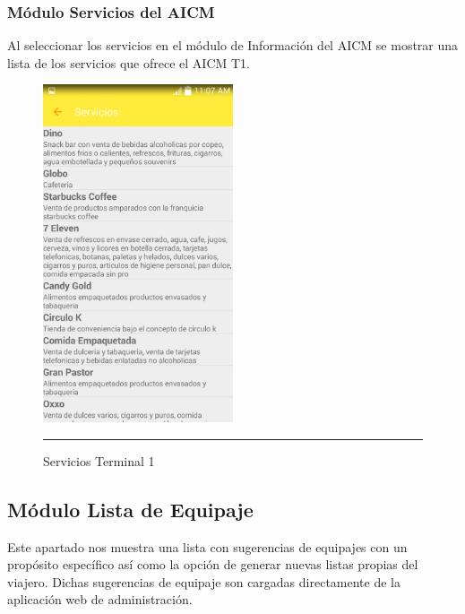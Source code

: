 \subsubsection{Módulo Servicios del AICM}
Al seleccionar los servicios en el módulo de Información del AICM se mostrar una lista de los servicios que ofrece el AICM T1.

\begin{figure}[h]
	\centering
		\includegraphics[width=0.5\textwidth]{Figuras/servicios.png}
		\rule{30em}{0.5pt}
	\caption[Servicios Terminal 1]{Servicios Terminal 1}
	\label{fig:servicios}
\end{figure}
\clearpage

\subsection{Módulo Lista de Equipaje}
Este apartado nos muestra una lista con sugerencias de equipajes con un propósito específico así como la opción de generar nuevas listas propias del viajero. 
Dichas sugerencias de equipaje son cargadas directamente de la aplicación web de administración.

